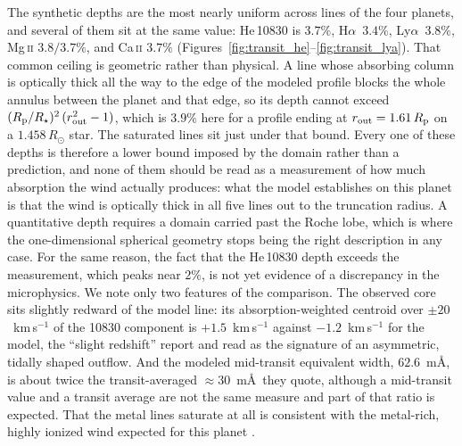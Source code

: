 \documentclass[twocolumn]{aastex702}
\newcommand{\Rp}{R_{\rm p}}
\newcommand{\Rstar}{R_{\star}}
\newcommand{\Lya}{\mbox{Ly}\ensuremath{\alpha}}
\newcommand{\Ha}{\mbox{H}\ensuremath{\alpha}}
\begin{document}
The synthetic depths are the most nearly uniform across lines of the four planets, and
several of them sit at the same value: \mbox{He\,10830} is $3.7\%$, \Ha\ $3.4\%$, \Lya\
$3.8\%$, \mbox{Mg\,\textsc{ii}} $3.8/3.7\%$, and \mbox{Ca\,\textsc{ii}} $3.7\%$
(Figures~\ref{fig:transit_he}--\ref{fig:transit_lya}). That common ceiling is geometric
rather than physical. A line whose absorbing column is optically thick all the way to the
edge of the modeled profile blocks the whole annulus between the planet and that edge, so
its depth cannot exceed $(\Rp/\Rstar)^2\,(r_{\rm out}^2-1)$, which is $3.9\%$ here for a
profile ending at $r_{\rm out}=1.61\,\Rp$ on a $1.458\,R_{\odot}$ star. The saturated lines
sit just under that bound. Every one of these depths is therefore a lower bound imposed by
the domain rather than a prediction, and none of them should be read as a measurement of
how much absorption the wind actually produces: what the model establishes on this planet
is that the wind is optically thick in all five lines out to the truncation radius. A
quantitative depth requires a domain carried past the Roche lobe, which is where the
one-dimensional spherical geometry stops being the right description in any case. For the
same reason, the fact that the \mbox{He\,10830} depth exceeds the \citet{Czesla2024}
measurement, which peaks near $2\%$, is not yet evidence of a discrepancy in the
microphysics. We note only two features of the comparison. The observed core sits slightly
redward of the model line: its absorption-weighted centroid over $\pm20$~km\,s$^{-1}$ of
the 10830 component is $+1.5$~km\,s$^{-1}$ against $-1.2$~km\,s$^{-1}$ for the model, the
``slight redshift'' \citet{Czesla2024} report and read as the signature of an
asymmetric, tidally shaped outflow. And the modeled mid-transit equivalent width,
$62.6$~m\AA, is about twice the transit-averaged ${\approx}30$~m\AA\ they quote, although
a mid-transit value and a transit average are not the same measure and part of that ratio
is expected. That the metal lines saturate at all is consistent with the
metal-rich, highly ionized wind expected for this planet
\citep{Huang2023,Koskinen2022}.
\end{document}
